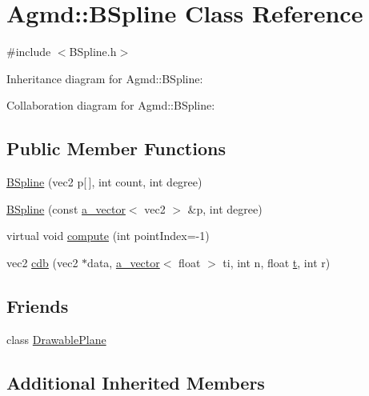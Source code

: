 \hypertarget{class_agmd_1_1_b_spline}{\section{Agmd\+:\+:B\+Spline Class Reference}
\label{class_agmd_1_1_b_spline}
}


{\ttfamily \#include $<$B\+Spline.\+h$>$}



Inheritance diagram for Agmd\+:\+:B\+Spline\+:


Collaboration diagram for Agmd\+:\+:B\+Spline\+:
\subsection*{Public Member Functions}
\begin{DoxyCompactItemize}
\item 
\hyperlink{class_agmd_1_1_b_spline_a8046af3910354146765ff276d13671d4}{B\+Spline} (vec2 p\mbox{[}$\,$\mbox{]}, int count, int degree)
\item 
\hyperlink{class_agmd_1_1_b_spline_a3d20dd969b2dc4f868f28ca90a7c4ca9}{B\+Spline} (const \hyperlink{_vector_8h_a3df82cea60ff4ad0acb44e58454406a5}{a\+\_\+vector}$<$ vec2 $>$ \&p, int degree)
\item 
virtual void \hyperlink{class_agmd_1_1_b_spline_a00da37dc51263b61be82f3ff933b392e}{compute} (int point\+Index=-\/1)
\item 
vec2 \hyperlink{class_agmd_1_1_b_spline_a6f84080be4ae3e90fb32725606ae7bb5}{cdb} (vec2 $\ast$data, \hyperlink{_vector_8h_a3df82cea60ff4ad0acb44e58454406a5}{a\+\_\+vector}$<$ float $>$ ti, int n, float \hyperlink{_examples_2_planet_2_app_8cpp_a125ce9f8ead659256dbdd0816ede24d4}{t}, int r)
\end{DoxyCompactItemize}
\subsection*{Friends}
\begin{DoxyCompactItemize}
\item 
class \hyperlink{class_agmd_1_1_b_spline_abd140f9d7517b23f834000b9238bd85f}{Drawable\+Plane}
\end{DoxyCompactItemize}
\subsection*{Additional Inherited Members}


